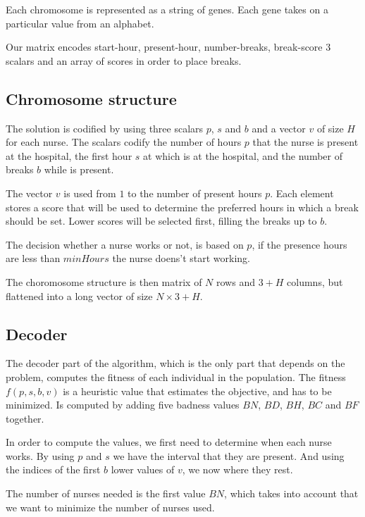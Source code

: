 \documentclass[12pt,a4paper]{article}
\begin{document}
Each chromosome is represented as a string of genes. Each gene takes on a 
particular value from an alphabet.

Our matrix encodes start-hour, present-hour, number-breaks, break-score
3 scalars and an array of scores in order to place breaks.


\subsection{Chromosome structure}

The solution is codified by using three scalars $p$, $s$ and $b$ and a vector 
$v$ of size $H$ for each nurse. The scalars codify the number of hours $p$ that 
the nurse is present at the hospital, the first hour $s$ at which is at the 
hospital, and the number of breaks $b$ while is present.

The vector $v$ is used from $1$ to the number of present hours $p$. Each element 
stores a score that will be used to determine the preferred hours in which a 
break should be set. Lower scores will be selected first, filling the breaks up 
to $b$.

The decision whether a nurse works or not, is based on $p$, if the presence 
hours are less than $minHours$ the nurse doens't start working.

The choromosome structure is then matrix of $N$ rows and $3+H$ columns, but 
flattened into a long vector of size $N \times 3+H$.

\subsection{Decoder}

The decoder part of the algorithm, which is the only part that depends on the 
problem, computes the fitness of each individual in the population. The fitness 
$f(p,s,b,v)$ is a heuristic value that estimates the objective, and has to be 
minimized. Is computed by adding five badness values $BN$, $BD$, $BH$, $BC$ and 
$BF$ together.

In order to compute the values, we first need to determine when each nurse 
works. By using $p$ and $s$ we have the interval that they are present.  And 
using the indices of the first $b$ lower values of $v$, we now where they rest.

The number of nurses needed is the first value $BN$, which takes into account 
that we want to minimize the number of nurses used.
\end{document}
